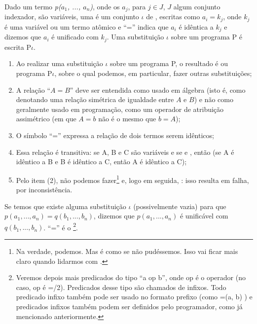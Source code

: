 
\begin{definition} Dado um termo {\it p($a_1$, ..., $a_n$)}, onde os $a_j$, para $j \in J$, $J$ algum conjunto indexador, são variáveis, uma  é um conjunto $\iota$ de , escritas como $a_i = k_j$, onde $k_j$ é uma variável ou um termo atômico e ``='' indica que $a_i$ é idêntica a $k_j$ e dizemos que $a_i$ é unificado com $k_j$.
  Uma substituição $\iota$ sobre um programa P é escrita P$\iota$.
\end{definition}

\begin{remark}
  \hfill
  \begin{enumerate}
    \item Ao realizar uma substituição $\iota$ sobre um programa P, o resultado é ou programa P$\iota$, sobre o qual podemos, em particular, fazer outras substituições;
    \item A relação ``$A = B$'' deve ser entendida como usado em álgebra (isto é, como denotando uma relação simétrica de igualdade entre $A$ e $B$) e não como geralmente usado em programação, como um operador de atribuição assimétrico (em que $A = b$ não é o mesmo que $b = A$);
    \item O símbolo ``='' expressa a relação de dois termos serem idênticos;
    \item Essa relação é transitiva: se A, B e C são variáveis e se  e , então  (se A é idêntico a B e B é idêntico a C, então A é idêntico a C);
    \item Pelo item (2), não podemos fazer\footnote{Na verdade, podemos. Mas é como se não pudéssemos. Isso vai ficar mais claro quando lidarmos com .}  e, logo em seguida, : isso resulta em falha, por inconsistência.
  \end{enumerate}
\end{remark}

Se temos que existe alguma substituição $\iota$ (possivelmente vazia) para que $p(a_1, ..., a_n) = q(b_1, ..., b_n)$, dizemos que  $p(a_1, ..., a_n)$ é unificável com $q(b_1, ..., b_n)$. ``='' é o \footnote{Veremos depois mais
  predicados do tipo ``a op b'', onde op é o operador (no caso, op é =/2). Predicados desse tipo são chamados de infixos. Todo predicado infixo também pode ser usado no formato prefixo (como =(a, b) ) e predicados infixos também podem ser definidos pelo programador, como já mencionado anteriormente.}.

